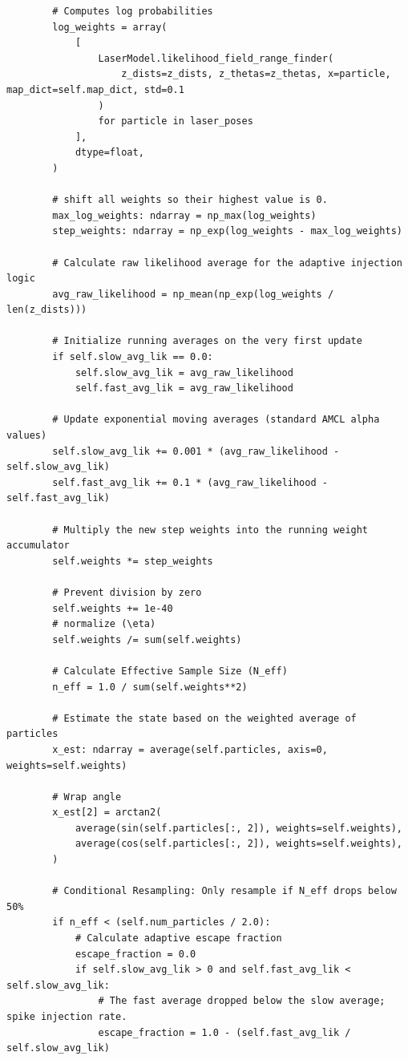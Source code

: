 \begin{verbatim}
        # Computes log probabilities
        log_weights = array(
            [
                LaserModel.likelihood_field_range_finder(
                    z_dists=z_dists, z_thetas=z_thetas, x=particle, map_dict=self.map_dict, std=0.1
                )
                for particle in laser_poses
            ],
            dtype=float,
        )

        # shift all weights so their highest value is 0.
        max_log_weights: ndarray = np_max(log_weights)
        step_weights: ndarray = np_exp(log_weights - max_log_weights)

        # Calculate raw likelihood average for the adaptive injection logic
        avg_raw_likelihood = np_mean(np_exp(log_weights / len(z_dists)))

        # Initialize running averages on the very first update
        if self.slow_avg_lik == 0.0:
            self.slow_avg_lik = avg_raw_likelihood
            self.fast_avg_lik = avg_raw_likelihood

        # Update exponential moving averages (standard AMCL alpha values)
        self.slow_avg_lik += 0.001 * (avg_raw_likelihood - self.slow_avg_lik)
        self.fast_avg_lik += 0.1 * (avg_raw_likelihood - self.fast_avg_lik)

        # Multiply the new step weights into the running weight accumulator
        self.weights *= step_weights

        # Prevent division by zero
        self.weights += 1e-40
        # normalize (\eta)
        self.weights /= sum(self.weights)

        # Calculate Effective Sample Size (N_eff)
        n_eff = 1.0 / sum(self.weights**2)

        # Estimate the state based on the weighted average of particles
        x_est: ndarray = average(self.particles, axis=0, weights=self.weights)

        # Wrap angle
        x_est[2] = arctan2(
            average(sin(self.particles[:, 2]), weights=self.weights),
            average(cos(self.particles[:, 2]), weights=self.weights),
        )

        # Conditional Resampling: Only resample if N_eff drops below 50%
        if n_eff < (self.num_particles / 2.0):
            # Calculate adaptive escape fraction
            escape_fraction = 0.0
            if self.slow_avg_lik > 0 and self.fast_avg_lik < self.slow_avg_lik:
                # The fast average dropped below the slow average; spike injection rate.
                escape_fraction = 1.0 - (self.fast_avg_lik / self.slow_avg_lik)


\end{verbatim}
